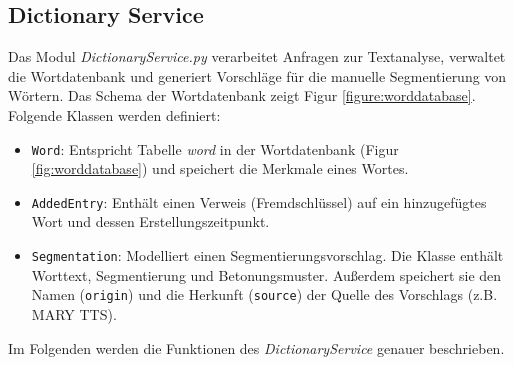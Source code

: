 \subsection{Dictionary Service}
\label{sec:dictionary-service}

Das Modul \textit{DictionaryService.py} verarbeitet Anfragen zur Textanalyse, verwaltet die Wortdatenbank und generiert Vorschläge für die manuelle Segmentierung von Wörtern. Das Schema der Wortdatenbank zeigt Figur \ref{figure:worddatabase}. Folgende Klassen werden definiert:
\begin{itemize}
	\item \texttt{Word}: Entspricht Tabelle \textit{word} in der Wortdatenbank (Figur \ref{fig:worddatabase}) und speichert die Merkmale eines Wortes.
	\item \texttt{AddedEntry}: Enthält einen Verweis (Fremdschlüssel) auf ein hinzugefügtes Wort und dessen Erstellungszeitpunkt.
	\item \texttt{Segmentation}: Modelliert einen Segmentierungsvorschlag. Die Klasse enthält Worttext, Segmentierung und Betonungsmuster. Außerdem speichert sie den Namen (\texttt{origin}) und die Herkunft (\texttt{source}) der Quelle des Vorschlags (z.B. MARY TTS).
\end{itemize}

Im Folgenden werden die Funktionen des \textit{DictionaryService} genauer beschrieben.

